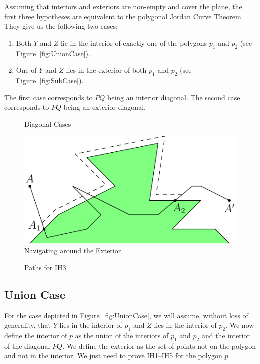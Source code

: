 Assuming that interiors and exteriors are non-empty and cover the plane, the first three hypotheses are equivalent to the polygonal Jordan Curve Theorem. They give us the following two cases:

\begin{enumerate}
\item Both $Y$ and $Z$ lie in the interior of exactly one of the polygons $p_1$ and $p_2$ (see Figure~\ref{fig:UnionCase}).
\item One of $Y$ and $Z$ lies in the exterior of both $p_1$ and $p_2$ (see Figure~\ref{fig:SubCase}).
\end{enumerate}

The first case corresponds to $PQ$ being an interior diagonal. The second case corresponds to $PQ$ being an exterior diagonal.

\begin{figure}
\centering
{}
\caption{Diagonal Cases}
\label{fig:DiagonalCases}
\end{figure}

\begin{figure}
\centering
\includegraphics{jordan/navigation1.pdf}
\caption{Navigating around the Exterior}
\label{fig:Navigation1}
\end{figure}

\begin{figure}
\centering
{}
\caption{Paths for IH3}
\end{figure}

\subsection{Union Case}
For the case depicted in Figure~\ref{fig:UnionCase}, we will assume, without loss of generality, that $Y$ lies in the interior of $p_1$ and $Z$ lies in the interior of $p_2$. We now define the interior of $p$ as the union of the interiors of $p_1$ and $p_2$ and the interior of the diagonal $PQ$. We define the exterior as the set of points not on the polygon and not in the interior. We just need to prove IH1--IH5 for the polygon $p$. 

